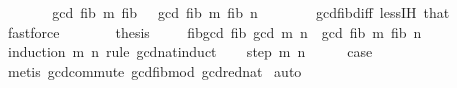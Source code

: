 \begin{isabellebody}
\ \ \ \ \isamarkupfalse%
\ \isamarkupfalse%
\ {\isachardoublequoteopen}gcd\ {\isacharparenleft}{\kern0pt}fib\ m{\isacharparenright}{\kern0pt}\ {\isacharparenleft}{\kern0pt}fib\ {\isasymdots}{\isacharparenright}{\kern0pt}\ {\isacharequal}{\kern0pt}\ gcd\ {\isacharparenleft}{\kern0pt}fib\ m{\isacharparenright}{\kern0pt}\ {\isacharparenleft}{\kern0pt}fib\ n{\isacharparenright}{\kern0pt}{\isachardoublequoteclose}\isanewline
\ \ \ \ \ \ \isamarkupfalse%
\ gcd{\isacharunderscore}{\kern0pt}fib{\isacharunderscore}{\kern0pt}diff\ less{\isachardot}{\kern0pt}IH\ that\ \isamarkupfalse%
\ fastforce\isanewline
\ \ \ \ \isamarkupfalse%
\ \isamarkupfalse%
\ {\isacharquery}{\kern0pt}thesis\ \isakeywordONE{{\isachardot}{\kern0pt}}\isamarkupfalse%
\isanewline
\ \ \isamarkupfalse%
\isanewline
{}\isamarkupfalse%
%
\endisatagproof
{\isafoldproof}%
%
\isadelimproof
\isanewline
%
\endisadelimproof
\isanewline
{}\isamarkupfalse%
\ fib{\isacharunderscore}{\kern0pt}gcd{\isacharcolon}{\kern0pt}\ {\isachardoublequoteopen}fib\ {\isacharparenleft}{\kern0pt}gcd\ m\ n{\isacharparenright}{\kern0pt}\ {\isacharequal}{\kern0pt}\ gcd\ {\isacharparenleft}{\kern0pt}fib\ m{\isacharparenright}{\kern0pt}\ {\isacharparenleft}{\kern0pt}fib\ n{\isacharparenright}{\kern0pt}{\isachardoublequoteclose}\isanewline
%
\isadelimproof
%
\endisadelimproof
%
\isatagproof
{}\isamarkupfalse%
\ {\isacharparenleft}{\kern0pt}induction\ m\ n\ rule{\isacharcolon}{\kern0pt}\ gcd{\isacharunderscore}{\kern0pt}nat{\isacharunderscore}{\kern0pt}induct{\isacharparenright}{\kern0pt}\isanewline
\ \ \isamarkupfalse%
\ {\isacharparenleft}{\kern0pt}step\ m\ n{\isacharparenright}{\kern0pt}\isanewline
\ \ \isamarkupfalse%
\ \isamarkupfalse%
\ {\isacharquery}{\kern0pt}case\isanewline
\ \ \ \ \isamarkupfalse%
\ {\isacharparenleft}{\kern0pt}metis\ gcd{\isachardot}{\kern0pt}commute\ gcd{\isacharunderscore}{\kern0pt}fib{\isacharunderscore}{\kern0pt}mod\ gcd{\isacharunderscore}{\kern0pt}red{\isacharunderscore}{\kern0pt}nat{\isacharparenright}{\kern0pt}\isanewline
{}\isamarkupfalse%
\ auto%
\endisatagproof
{\isafoldproof}%
%
\isadelimproof
\isanewline
%
\endisadelimproof
%
\isadelimtheory
\isanewline
%
\endisadelimtheory
%
\isatagtheory
{}\isamarkupfalse%
%
\endisatagtheory
{\isafoldtheory}%
%
\isadelimtheory
%
\endisadelimtheory
%
\end{isabellebody}%
